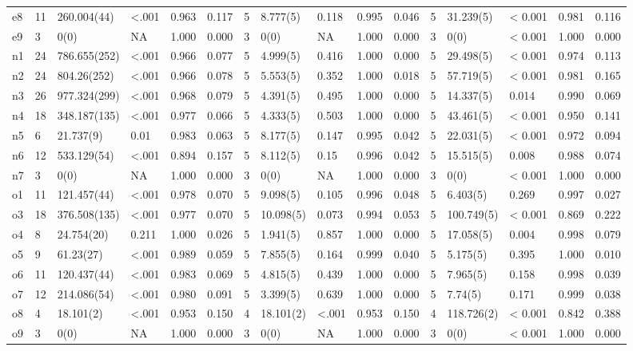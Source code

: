 \documentclass[,man,floatsintext]{apa6}
\theoremstyle{definition}
\theoremstyle{definition}
\theoremstyle{definition}
\theoremstyle{remark}
\begin{document}
\begin{table}
{\begin{tabular}[t]{llllllllllllllll}
e8 & 11 & 260.004(44) & <.001 & 0.963 & 0.117 & 5 & 8.777(5) & 0.118 & 0.995 & 0.046 & 5 & 31.239(5) & < 0.001 & 0.981 & 0.116\\
e9 & 3 & 0(0) & NA & 1.000 & 0.000 & 3 & 0(0) & NA & 1.000 & 0.000 & 3 & 0(0) & < 0.001 & 1.000 & 0.000\\
n1 & 24 & 786.655(252) & <.001 & 0.966 & 0.077 & 5 & 4.999(5) & 0.416 & 1.000 & 0.000 & 5 & 29.498(5) & < 0.001 & 0.974 & 0.113\\
n2 & 24 & 804.26(252) & <.001 & 0.966 & 0.078 & 5 & 5.553(5) & 0.352 & 1.000 & 0.018 & 5 & 57.719(5) & < 0.001 & 0.981 & 0.165\\
n3 & 26 & 977.324(299) & <.001 & 0.968 & 0.079 & 5 & 4.391(5) & 0.495 & 1.000 & 0.000 & 5 & 14.337(5) & 0.014 & 0.990 & 0.069\\
n4 & 18 & 348.187(135) & <.001 & 0.977 & 0.066 & 5 & 4.333(5) & 0.503 & 1.000 & 0.000 & 5 & 43.461(5) & < 0.001 & 0.950 & 0.141\\
n5 & 6 & 21.737(9) & 0.01 & 0.983 & 0.063 & 5 & 8.177(5) & 0.147 & 0.995 & 0.042 & 5 & 22.031(5) & < 0.001 & 0.972 & 0.094\\
n6 & 12 & 533.129(54) & <.001 & 0.894 & 0.157 & 5 & 8.112(5) & 0.15 & 0.996 & 0.042 & 5 & 15.515(5) & 0.008 & 0.988 & 0.074\\
n7 & 3 & 0(0) & NA & 1.000 & 0.000 & 3 & 0(0) & NA & 1.000 & 0.000 & 3 & 0(0) & < 0.001 & 1.000 & 0.000\\
o1 & 11 & 121.457(44) & <.001 & 0.978 & 0.070 & 5 & 9.098(5) & 0.105 & 0.996 & 0.048 & 5 & 6.403(5) & 0.269 & 0.997 & 0.027\\
o3 & 18 & 376.508(135) & <.001 & 0.977 & 0.070 & 5 & 10.098(5) & 0.073 & 0.994 & 0.053 & 5 & 100.749(5) & < 0.001 & 0.869 & 0.222\\
o4 & 8 & 24.754(20) & 0.211 & 1.000 & 0.026 & 5 & 1.941(5) & 0.857 & 1.000 & 0.000 & 5 & 17.058(5) & 0.004 & 0.998 & 0.079\\
o5 & 9 & 61.23(27) & <.001 & 0.989 & 0.059 & 5 & 7.855(5) & 0.164 & 0.999 & 0.040 & 5 & 5.175(5) & 0.395 & 1.000 & 0.010\\
o6 & 11 & 120.437(44) & <.001 & 0.983 & 0.069 & 5 & 4.815(5) & 0.439 & 1.000 & 0.000 & 5 & 7.965(5) & 0.158 & 0.998 & 0.039\\
o7 & 12 & 214.086(54) & <.001 & 0.980 & 0.091 & 5 & 3.399(5) & 0.639 & 1.000 & 0.000 & 5 & 7.74(5) & 0.171 & 0.999 & 0.038\\
o8 & 4 & 18.101(2) & <.001 & 0.953 & 0.150 & 4 & 18.101(2) & <.001 & 0.953 & 0.150 & 4 & 118.726(2) & < 0.001 & 0.842 & 0.388\\
o9 & 3 & 0(0) & NA & 1.000 & 0.000 & 3 & 0(0) & NA & 1.000 & 0.000 & 3 & 0(0) & < 0.001 & 1.000 & 0.000\\
\bottomrule
\end{tabular}}
\end{table}
\end{document}
